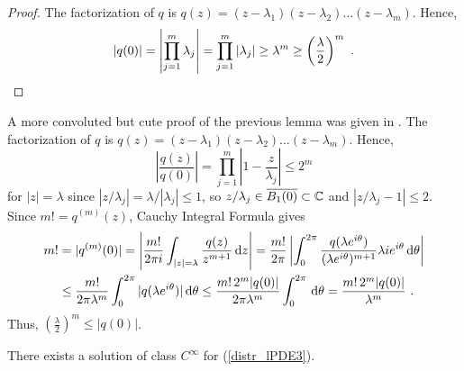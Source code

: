 \begin{proof}
The factorization of $q$ is
$\displaystyle q(z) = (z-\lambda_1)(z-\lambda_2)\ldots(z-\lambda_m)$.
Hence,
\[
\left| q(0) \right| = \left| \prod_{j=1}^m \lambda_j \right|
= \prod_{j=1}^m \left| \lambda_j \right| \geq
\lambda^m \geq \left(\frac{\lambda}{2}\right)^m \ .  \qedhere
\]
\end{proof}

\begin{rmk}
A more convoluted but cute proof of the previous lemma was given in
\cite{FoPDE}.  The factorization of $q$ is
$\displaystyle q(z) = (z-\lambda_1)(z-\lambda_2)\ldots(z-\lambda_m)$.
Hence,
\[
\left| \frac{q(z)}{q(0)} \right| = \prod_{j=1}^m
\left| 1 - \frac{z}{\lambda_j} \right| \leq 2^m
\]
for $|z|= \lambda$ since $|z/\lambda_j| = \lambda/|\lambda_j| \leq 1$,
so $z/\lambda_j \in \overline{B_1(0)} \subset \mathbb{C}$ and
$|z/\lambda_j - 1| \leq 2$.  Since $\displaystyle m! = q^{(m)}(z)$,
Cauchy Integral Formula gives
\begin{align*}
m! & = |q^{(m)}(0)| = \left| \frac{m!}{2\pi i}
\int_{|z|=\lambda} \frac{q(z)}{z^{m+1}} \,\mathrm{d}{z} \right|
= \frac{m!}{2\pi} \left| \int_0^{2\pi}
\frac{q(\lambda e^{i\theta})}{(\lambda e^{i\theta})^{m+1}}
\lambda i e^{i\theta} \,\mathrm{d}{\theta}\right| \\
& \leq \frac{m!}{2\pi \lambda^m} \int_0^{2\pi}
|q(\lambda e^{i\theta})| \,\mathrm{d}{\theta}
\leq \frac{m!\, 2^m |q(0)|}{2\pi \lambda^m} \int_0^{2\pi} \,\mathrm{d}{\theta}
= \frac{m!\, 2^m |q(0)|}{\lambda^m} \ .
\end{align*}
Thus, $\displaystyle \left(\frac{\lambda}{2}\right)^m \leq |q(0)|$.
\end{rmk}

\begin{theorem} \label{distr_lPDE3_ex4}
There exists a solution of class $\displaystyle C^\infty$ for
(\ref{distr_lPDE3}).
\end{theorem}

